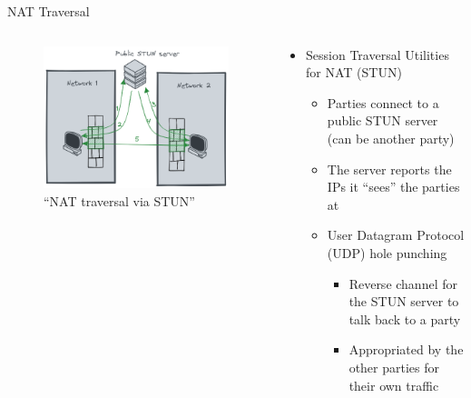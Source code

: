\begin{frame}{NAT Traversal}
\protect\hypertarget{nat-traversal}{}
\begin{columns}[T]
\begin{column}{0.48\textwidth}
\begin{figure}
\centering
\includegraphics[width=\textwidth,height=0.66\textheight]{presentation/../figures/nat-traversal.png}
\caption{``NAT traversal via STUN''\label{nat-traversal}}
\end{figure}
\end{column}

\begin{column}{0.48\textwidth}
\begin{itemize}
\tightlist
\item
  Session Traversal Utilities for NAT (STUN)

  \begin{itemize}
  \tightlist
  \item
    Parties connect to a public STUN server (can be another party)
  \item
    The server reports the IPs it ``sees'' the parties at
  \item
    User Datagram Protocol (UDP) hole punching

    \begin{itemize}
    \tightlist
    \item
      Reverse channel for the STUN server to talk back to a party
    \item
      Appropriated by the other parties for their own traffic
    \end{itemize}
  \end{itemize}
\end{itemize}
\end{column}
\end{columns}
\end{frame}

